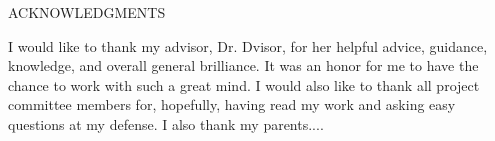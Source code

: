 \documentclass[12pt,leqno]{article}\usepackage[pdftex]{graphicx}\usepackage[usenames,dvipsnames]{xcolor}
\theoremstyle{remark}
\begin{document}
\thispagestyle{empty}
\newpage

\begin{center}
ACKNOWLEDGMENTS
\end{center}
\doublespacing

I would like to thank my advisor, Dr. Dvisor, for her helpful advice, guidance, knowledge, and overall general brilliance. It was an honor for me to have the chance to work with such a great mind. I would also like to thank all project committee members for, hopefully, having read my work and asking easy questions at my defense. I  also thank my parents....
\newline\newline\newline

\singlespacing
\thispagestyle{empty}
\newpage


\begin{center}
\tableofcontents
\end{center}
\thispagestyle{empty}
\newpage






\begin{center}
\listoftables
\end{center}
\thispagestyle{empty}
\newpage

\end{document}
